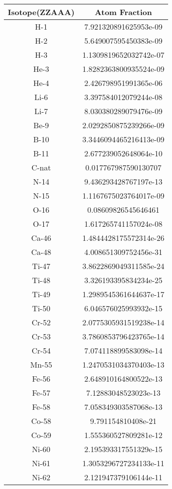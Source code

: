 \begin{table}[h!]
\centering
\begin{tabular}{|| c || c |}
\hline
Isotope(ZZAAA) & Atom Fraction \\
\hline \hline

H-1 & 7.921320891625953e-09 \\
H-2 & 5.649007595450383e-09 \\
H-3 & 1.1309819652032742e-07 \\
He-3 & 1.8282363800935524e-09 \\
He-4 & 2.426798951991365e-06 \\
Li-6 & 3.397584012079244e-08 \\
Li-7 & 8.030380289079476e-09 \\
Be-9 & 2.0292850875239266e-09 \\
B-10 & 3.3446094465216413e-09 \\
B-11 & 2.677239052648064e-10 \\
C-nat & 0.017767987590130707 \\
N-14 & 9.436293428767197e-13 \\
N-15 & 1.1167675023764017e-09 \\
O-16 & 0.08609826545646461 \\
O-17 & 1.617265741157024e-08 \\
Ca-46 & 1.4844428175572314e-26 \\
Ca-48 & 4.008651309752456e-31 \\
Ti-47 & 3.8622869049311585e-24 \\
Ti-48 & 3.326193395834234e-25 \\
Ti-49 & 1.2989545361644637e-17 \\
Ti-50 & 6.046576025993932e-15 \\
Cr-52 & 2.0775305931519238e-14 \\
Cr-53 & 3.7860853796423765e-14 \\
Cr-54 & 7.074118899583098e-14 \\
Mn-55 & 1.2470531034370403e-13 \\
Fe-56 & 2.648910164800522e-13 \\
Fe-57 & 7.12883048523023e-13 \\
Fe-58 & 7.058349303587068e-13 \\
Co-58 & 9.791154810408e-21 \\
Co-59 & 1.555360527809281e-12 \\
Ni-60 & 2.195393317551329e-15 \\
Ni-61 & 1.3053296727234133e-11 \\
Ni-62 & 2.121947379106144e-11 \\

\end{tabular}
\end{table}
